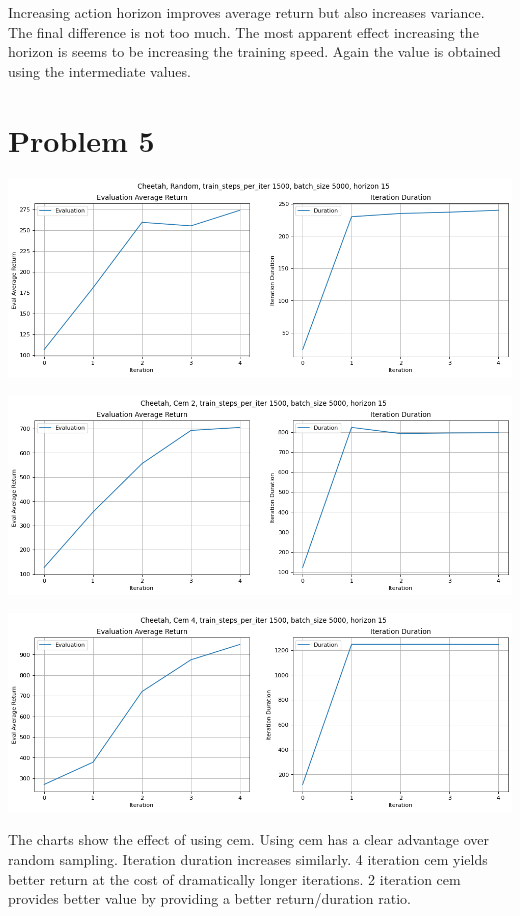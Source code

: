 \documentclass[11pt]{article}
\begin{document}
    Increasing action horizon improves average return but also increases variance.
    The final difference is not too much.
    The most apparent effect increasing the horizon is seems to be increasing the training speed.
    Again the value is obtained using the intermediate values.

    \section*{Problem 5}

    \hspace*{-0.6in}
    \includegraphics[scale=0.5]{q5/random}

    \hspace*{-0.6in}
    \includegraphics[scale=0.5]{q5/cem2}

    \hspace*{-0.6in}
    \includegraphics[scale=0.5]{q5/cem4}

    The charts show the effect of using cem.
    Using cem has a clear advantage over random sampling.
    Iteration duration increases similarly.
    4 iteration cem yields better return at the cost of dramatically longer iterations.
    2 iteration cem provides better value by providing a better return/duration ratio.
\end{document}
